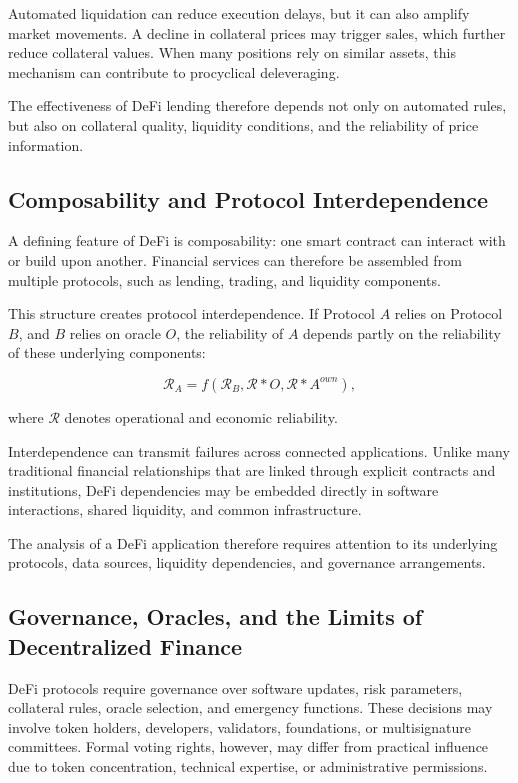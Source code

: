 Automated liquidation can reduce execution delays, but it can also amplify market movements. A decline in collateral prices may trigger sales, which further reduce collateral values. When many positions rely on similar assets, this mechanism can contribute to procyclical deleveraging.

The effectiveness of DeFi lending therefore depends not only on automated rules, but also on collateral quality, liquidity conditions, and the reliability of price information.


\subsection{Composability and Protocol Interdependence}

A defining feature of DeFi is composability: one smart contract can interact with or build upon another. Financial services can therefore be assembled from multiple protocols, such as lending, trading, and liquidity components.

This structure creates protocol interdependence. If Protocol \(A\) relies on Protocol \(B\), and \(B\) relies on oracle \(O\), the reliability of \(A\) depends partly on the reliability of these underlying components:

\begin{equation}
\mathcal{R}_A
=f(\mathcal{R}_B,\mathcal{R}*O,\mathcal{R}*{A}^{own}),
\label{eq:ch24-composability-reliability}
\end{equation}

where \(\mathcal{R}\) denotes operational and economic reliability.

Interdependence can transmit failures across connected applications. Unlike many traditional financial relationships that are linked through explicit contracts and institutions, DeFi dependencies may be embedded directly in software interactions, shared liquidity, and common infrastructure.

The analysis of a DeFi application therefore requires attention to its underlying protocols, data sources, liquidity dependencies, and governance arrangements.


\subsection{Governance, Oracles, and the Limits of Decentralized Finance}

DeFi protocols require governance over software updates, risk parameters, collateral rules, oracle selection, and emergency functions. These decisions may involve token holders, developers, validators, foundations, or multisignature committees. Formal voting rights, however, may differ from practical influence due to token concentration, technical expertise, or administrative permissions.

